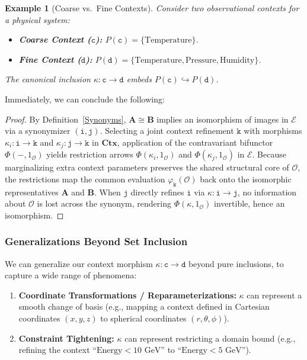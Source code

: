 \documentclass{article}
\newtheorem{eg}{Example}
\numberwithin{tm}{section}
\numberwithin{dn}{section}
\numberwithin{as}{section}
\numberwithin{rk}{section}
\numberwithin{lem}{section}
\numberwithin{ax}{section}
\numberwithin{pp}{section}
\numberwithin{eg}{section}
\numberwithin{war}{section}
\numberwithin{equation}{section}
\numberwithin{prop}{section}
\numberwithin{nt}{section}
\numberwithin{rc}{section}
\def\code#1{\texttt{#1}}
\begin{document}
\begin{eg}[Coarse vs.\ Fine Contexts]
	Consider two observational contexts for a physical system:
	\begin{itemize}
		\item \textbf{Coarse Context ($\code{c}$):} $P(\code{c}) = \{\text{Temperature}\}$.
		\item \textbf{Fine Context ($\code{d}$):} $P(\code{d}) = \{\text{Temperature}, \text{Pressure}, \text{Humidity}\}$.
	\end{itemize}
	The canonical inclusion $\kappa: \code{c} \to \code{d}$ embeds $P(\code{c}) \hookrightarrow P(\code{d})$.
\end{eg}

Immediately, we can conclude the following:
\begin{proof}
	By Definition~\ref{Synonyms}, $\mathbf{A} \cong \mathbf{B}$ implies an isomorphism of images in $\mathcal{E}$ via a synonymizer $(\code{i}, \code{j})$. Selecting a joint context refinement $\code{k}$ with morphisms $\kappa_i: \code{i} \to \code{k}$ and $\kappa_j: \code{j} \to \code{k}$ in $\mathbf{Ctx}$, application of the contravariant bifunctor $\Phi(-, 1_\mathcal{O})$ yields restriction arrows $\Phi(\kappa_i, 1_\mathcal{O})$ and $\Phi(\kappa_j, 1_\mathcal{O})$ in $\mathcal{E}$. Because marginalizing extra context parameters preserves the shared structural core of $\mathcal{O}$, the restrictions map the common evaluation $\varphi_{\code{k}}(\mathcal{O})$ back onto the isomorphic representatives $\mathbf{A}$ and $\mathbf{B}$. When $\code{j}$ directly refines $\code{i}$ via $\kappa: \code{i} \to \code{j}$, no information about $\mathcal{O}$ is lost across the synonym, rendering $\Phi(\kappa, 1_\mathcal{O})$ invertible, hence an isomorphism.
\end{proof}



\subsubsection*{Generalizations Beyond Set Inclusion}

We can generalize our context morphism $\kappa: \code{c} \to \code{d}$ beyond pure inclusions, to capture a wide range of phenomena:

\begin{enumerate}
	\item \textbf{Coordinate Transformations / Reparameterizations:} $\kappa$ can represent a smooth change of basis (e.g., mapping a context defined in Cartesian coordinates $(x,y,z)$ to spherical coordinates $(r, \theta, \phi)$).
	\item \textbf{Constraint Tightening:} $\kappa$ can represent restricting a domain bound (e.g., refining the context $\text{``Energy} < 10\text{ GeV''}$ to $\text{``Energy} < 5\text{ GeV''}$).
\end{enumerate}
\end{document}
